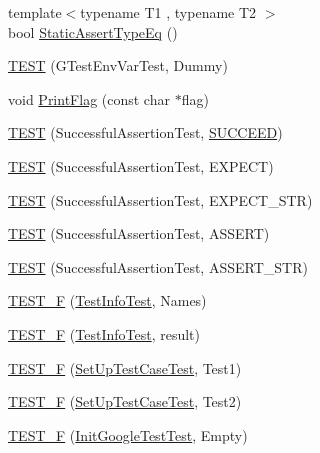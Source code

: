 \begin{DoxyCompactItemize}
\item 
{\footnotesize template$<$typename T1 , typename T2 $>$ }\\bool \hyperlink{namespacetesting_a661e70fc6afeb5c085eed3716aa45059}{Static\-Assert\-Type\-Eq} ()
\item 
\hyperlink{namespacetesting_af4187d1b48a2812f1335721ed8f30a99}{T\-E\-S\-T} (G\-Test\-Env\-Var\-Test, Dummy)
\item 
void \hyperlink{namespacetesting_a9863402455bfcf9be5fc0b1453a6d97d}{Print\-Flag} (const char $\ast$flag)
\item 
\hyperlink{namespacetesting_ae0cbea692840c88ab0b03285eb69ac97}{T\-E\-S\-T} (Successful\-Assertion\-Test, \hyperlink{include_2gtest_2gtest_8h_a75adcdf89f69b0b615e395daafc315af}{S\-U\-C\-C\-E\-E\-D})
\item 
\hyperlink{namespacetesting_af6c8f998f934372e5687d3998068e5e4}{T\-E\-S\-T} (Successful\-Assertion\-Test, E\-X\-P\-E\-C\-T)
\item 
\hyperlink{namespacetesting_a9b1e4b53f277d25e6d6413a0004481bb}{T\-E\-S\-T} (Successful\-Assertion\-Test, E\-X\-P\-E\-C\-T\-\_\-\-S\-T\-R)
\item 
\hyperlink{namespacetesting_afbe4c8233faff6eba04902b3cb041632}{T\-E\-S\-T} (Successful\-Assertion\-Test, A\-S\-S\-E\-R\-T)
\item 
\hyperlink{namespacetesting_a83dfac108c207258287b9f7aa9171e8a}{T\-E\-S\-T} (Successful\-Assertion\-Test, A\-S\-S\-E\-R\-T\-\_\-\-S\-T\-R)
\item 
\hyperlink{namespacetesting_acd53db89097aba1468724d6446069b1e}{T\-E\-S\-T\-\_\-\-F} (\hyperlink{classtesting_1_1_test_info_test}{Test\-Info\-Test}, Names)
\item 
\hyperlink{namespacetesting_ab00e29c00b3e29cdfa21d23b79dd3776}{T\-E\-S\-T\-\_\-\-F} (\hyperlink{classtesting_1_1_test_info_test}{Test\-Info\-Test}, result)
\item 
\hyperlink{namespacetesting_a01e948eb5427d31f70eafaf472e2bfa8}{T\-E\-S\-T\-\_\-\-F} (\hyperlink{classtesting_1_1_set_up_test_case_test}{Set\-Up\-Test\-Case\-Test}, Test1)
\item 
\hyperlink{namespacetesting_a8fc2e448ce96e4da357a2129d49e86e3}{T\-E\-S\-T\-\_\-\-F} (\hyperlink{classtesting_1_1_set_up_test_case_test}{Set\-Up\-Test\-Case\-Test}, Test2)
\item 
\hyperlink{namespacetesting_ae80ccfaa178730f49af649cd044e84e4}{T\-E\-S\-T\-\_\-\-F} (\hyperlink{classtesting_1_1_init_google_test_test}{Init\-Google\-Test\-Test}, Empty)
\item 

\end{DoxyCompactItemize}
